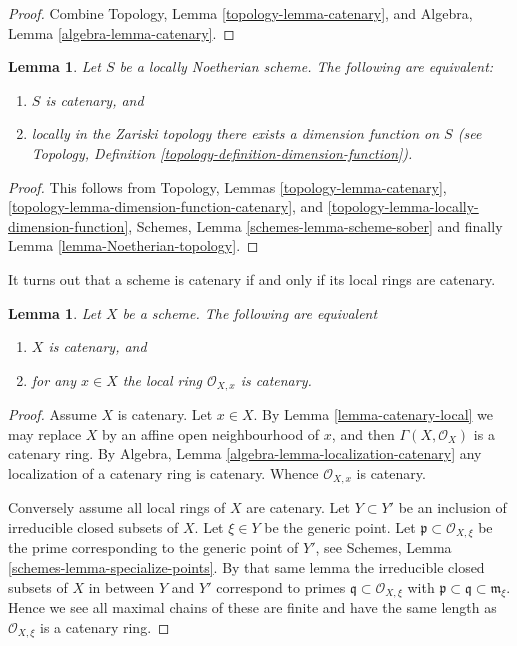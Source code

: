 \documentclass{stacks-project}
\theoremstyle{plain}
\newtheorem{lemma}[subsection]{Lemma}
\theoremstyle{definition}
\theoremstyle{remark}
\numberwithin{equation}{subsection}
\begin{document}
\begin{proof}
Combine Topology, Lemma \ref{topology-lemma-catenary}, and
Algebra, Lemma \ref{algebra-lemma-catenary}.
\end{proof}

\begin{lemma}
\label{lemma-catenary-dimension-function}
Let $S$ be a locally Noetherian scheme.
The following are equivalent:
\begin{enumerate}
\item $S$ is catenary, and
\item locally in the Zariski topology there exists a dimension function
on $S$ (see Topology, Definition \ref{topology-definition-dimension-function}).
\end{enumerate}
\end{lemma}

\begin{proof}
This follows from
Topology, Lemmas
\ref{topology-lemma-catenary},
\ref{topology-lemma-dimension-function-catenary}, and
\ref{topology-lemma-locally-dimension-function},
Schemes, Lemma \ref{schemes-lemma-scheme-sober}
and finally Lemma \ref{lemma-Noetherian-topology}.
\end{proof}

\noindent
It turns out that a scheme is catenary if and only if its local
rings are catenary.

\begin{lemma}
\label{lemma-catenary-local-rings-catenary}
Let $X$ be a scheme. The following are equivalent
\begin{enumerate}
\item $X$ is catenary, and
\item for any $x \in X$ the local ring $\mathcal{O}_{X, x}$ is
catenary.
\end{enumerate}
\end{lemma}

\begin{proof}
Assume $X$ is catenary. Let $x \in X$. By Lemma \ref{lemma-catenary-local}
we may replace $X$ by an affine open neighbourhood of $x$, and
then $\Gamma(X, \mathcal{O}_X)$ is a catenary ring. By
Algebra, Lemma \ref{algebra-lemma-localization-catenary} any
localization of a catenary ring is
catenary. Whence $\mathcal{O}_{X, x}$ is catenary.

\medskip\noindent
Conversely assume all local rings of $X$ are catenary.
Let $Y \subset Y'$ be an inclusion of irreducible closed
subsets of $X$. Let $\xi \in Y$ be the generic point.
Let $\mathfrak p \subset \mathcal{O}_{X, \xi}$ be the prime
corresponding to the generic point of $Y'$, see
Schemes, Lemma \ref{schemes-lemma-specialize-points}. By that same
lemma the irreducible closed subsets of $X$ in between $Y$ and $Y'$
correspond to primes $\mathfrak q \subset \mathcal{O}_{X, \xi}$
with $\mathfrak p \subset \mathfrak q \subset \mathfrak m_{\xi}$.
Hence we see all maximal chains of these are finite and have the
same length as $\mathcal{O}_{X, \xi}$ is a catenary ring.
\end{proof}
\end{document}
